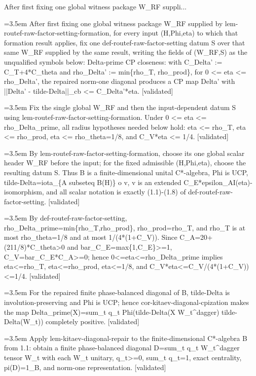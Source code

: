 \documentclass{article}
\newcommand{\step}[1]{\par\noindent\hangindent=3.5em\hangafter=1%
  \makebox[3.5em][l]{\textbf{#1.}}}
\newcommand{\steptag}[1]{\hfill{\small\textsf{[#1]}}}
\begin{document}
\begin{proofbox}{After first fixing one global witness package W\_RF suppli...}
\step{1} After first fixing one global witness package W\_RF supplied by lem-routef-raw-factor-setting-formation, for every input (H,Phi,eta) to which that formation result applies, fix one def-routef-raw-factor-setting datum S over that same W\_RF supplied by the same result, writing the fields of (W\_RF,S) as the unqualified symbols below: Delta-prime CP closeness: with C\_Delta' := C\_T+4*C\_theta and rho\_Delta' := min\{rho\_T, rho\_prod\}, for 0 <= eta <= rho\_Delta', the repaired norm-one diagonal produces a CP map Delta' with ||Delta' - tilde-Delta||\_cb <= C\_Delta'*eta. \steptag{validated} \\[6pt]
\step{1.1} Fix the single global W\_RF and then the input-dependent datum S using lem-routef-raw-factor-setting-formation. Under 0 <= eta <= rho\_Delta\_prime, all radius hypotheses needed below hold: eta <= rho\_T, eta <= rho\_prod, eta <= rho\_theta=1/8, and C\_V*eta <= 1/4. \steptag{validated} \\[6pt]
\step{1.1.1} By lem-routef-raw-factor-setting-formation, choose its one global scalar header W\_RF before the input; for the fixed admissible (H,Phi,eta), choose the resulting datum S. Thus B is a finite-dimensional unital C*-algebra, Phi is UCP, tilde-Delta=iota\_\{A subseteq B(H)\} o v, v is an extended C\_E*epsilon\_AI(eta)-isomorphism, and all scalar notation is exactly (1.1)-(1.8) of def-routef-raw-factor-setting. \steptag{validated} \\[4pt]
\step{1.1.2} By def-routef-raw-factor-setting, rho\_Delta\_prime=min\{rho\_T,rho\_prod\}, rho\_prod=rho\_T, and rho\_T is at most rho\_theta=1/8 and at most 1/(4*(1+C\_V)). Since C\_A=20+(211/8)*C\_theta>0 and bar\_C\_E=max\{1,C\_E\}>=1, C\_V=bar\_C\_E*C\_A>=0; hence 0<=eta<=rho\_Delta\_prime implies eta<=rho\_T, eta<=rho\_prod, eta<=1/8, and C\_V*eta<=C\_V/(4*(1+C\_V))<=1/4. \steptag{validated} \\[4pt]
\step{1.2} For the repaired finite phase-balanced diagonal of B, tilde-Delta is involution-preserving and Phi is UCP; hence cor-kitaev-diagonal-cpization makes the map Delta\_prime(X)=sum\_t q\_t Phi(tilde-Delta(X W\_t\textasciicircum{}dagger) tilde-Delta(W\_t)) completely positive. \steptag{validated} \\[6pt]
\step{1.2.1} Apply lem-kitaev-diagonal-repair to the finite-dimensional C*-algebra B from 1.1: obtain a finite phase-balanced diagonal D=sum\_t q\_t W\_t\textasciicircum{}dagger tensor W\_t with each W\_t unitary, q\_t>=0, sum\_t q\_t=1, exact centrality, pi(D)=1\_B, and norm-one representation. \steptag{validated} \\[4pt]

\end{proofbox}
\end{document}
